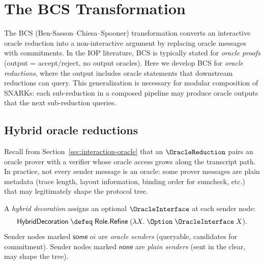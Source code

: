
\section{The BCS Transformation}\label{sec:interaction-bcs}

The BCS (Ben-Sasson--Chiesa--Spooner) transformation converts an interactive
oracle reduction into a non-interactive argument by replacing oracle messages
with commitments.
In the IOP literature, BCS is typically stated for \emph{oracle proofs}
(output = accept/reject, no output oracles).
Here we develop BCS for \emph{oracle reductions}, where the output includes
oracle statements that downstream reductions can query.
This generalization is necessary for modular composition of SNARKs: each
sub-reduction in a composed pipeline may produce oracle outputs that the next
sub-reduction queries.

\subsection{Hybrid oracle reductions}

Recall from Section~\ref{sec:interaction-oracle} that an
$\OracleReduction$ pairs an oracle prover with a verifier whose oracle
access grows along the transcript path.
In practice, not every sender message is an oracle: some prover messages are
plain metadata (trace length, layout information, binding order for
sumcheck, etc.) that may legitimately shape the protocol tree.

\begin{definition}[HybridDecoration]
  \label{bcs:hybrid-decoration}
  A \emph{hybrid decoration} assigns an optional $\OracleInterface$ at
  each sender node:
  \[
    \mathsf{HybridDecoration} \;\defeq\;
    \mathsf{Role.Refine}\;(\lambda X.\; \Option\;\OracleInterface\;X).
  \]
  Sender nodes marked $\mathsf{some}\;\mathit{oi}$ are \emph{oracle senders}
  (queryable, candidates for commitment).
  Sender nodes marked $\mathsf{none}$ are \emph{plain senders}
  (sent in the clear, may shape the tree).
\end{definition}

